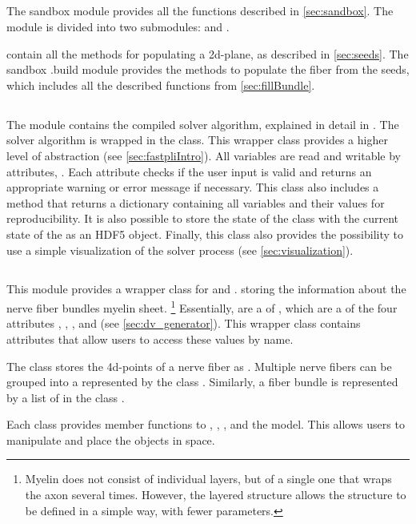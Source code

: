 \subsection{}
%
The sandbox module provides all the functions described in \cref{sec:sandbox}.
The module is divided into two submodules:  and .
\par
%
 contain all the methods for populating a 2d-plane, as described in \cref{sec:seeds}.
The sandbox .build module provides the methods to populate the fiber from the seeds, which includes all the described functions from \cref{sec:fillBundle}.
%
%
%
\subsection{}
%
The module  contains the compiled solver algorithm, explained in detail in .
The solver algorithm is wrapped in the  class.
This wrapper class provides a higher level of abstraction (see \cref{sec:fastpliIntro}).
All variables are read and writable by attributes, \eg{} .
Each attribute checks if the user input is valid and returns an appropriate warning or error message if necessary.
This class also includes a  method that returns a \python{} dictionary containing all variables and their values for reproducibility.
It is also possible to store the state of the class with the current state of the  as an \ac{HDF5} object.
Finally, this class also provides the possibility to use a simple visualization of the solver process (see \cref{sec:visualization}).
%
%
%
\subsection{}
%
This module provides a wrapper class for  and .
 storing the information about the nerve fiber bundles myelin sheet. \footnote{Myelin does not consist of individual layers, but of a single one that wraps the axon several times. However, the layered structure allows the structure to be defined in a simple way, with fewer parameters.}
Essentially,  are a  of , which are a  of the four attributes , , , and  (see \cref{sec:dv_generator}).
This wrapper class contains attributes that allow users to access these values by name.
\par
%
The class  stores the 4d-points of a nerve fiber as .
Multiple nerve fibers can be grouped into a  represented by the class .
Similarly, a fiber bundle is represented by a list of  in the class .
\par
%
Each class provides member functions to , , , and  the model.
This allows users to manipulate and place the objects in space.
%
%
%
